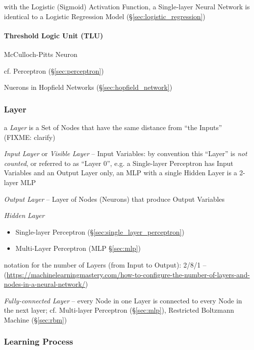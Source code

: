 with the Logistic (Sigmoid) Activation Function, a Single-layer Neural Network
is identical to a Logistic Regression Model (\S\ref{sec:logistic_regression})



\paragraph{Threshold Logic Unit (TLU)}\label{sec:tlu}\hfill

McCulloch-Pitts Neuron

cf. Perceptron (\S\ref{sec:perceptron})

Nuerons in Hopfield Networks (\S\ref{sec:hopfield_network})



\subsubsection{Layer}\label{sec:ann_layer}

a \emph{Layer} is a Set of Nodes that have the same distance from ``the Inputs''
(FIXME: clarify)

\emph{Input Layer} or \emph{Visible Layer} -- Input Variables: by convention
this ``Layer'' is \emph{not counted}, or referred to as ``Layer $0$'', e.g. a
Single-layer Perceptron has Input Variables and an Output Layer only, an MLP
with a single Hidden Layer is a 2-layer MLP

\emph{Output Layer} -- Layer of Nodes (Neurons) that produce Output Variables

\emph{Hidden Layer}

\begin{itemize}
  \item Single-layer Perceptron (\S\ref{sec:single_layer_perceptron})
  \item Multi-Layer Perceptron (MLP \S\ref{sec:mlp})
\end{itemize}

notation for the number of Layers (from Input to Output): 2/8/1 --
(\url{https://machinelearningmastery.com/how-to-configure-the-number-of-layers-and-nodes-in-a-neural-network/})

\emph{Fully-connected Layer} -- every Node in one Layer is connected to every
Node in the next layer; cf. Multi-layer Perceptron (\S\ref{sec:mlp}), Restricted
Boltzmann Machine (\S\ref{sec:rbm})



\subsubsection{Learning Process}\label{sec:learning_process}

